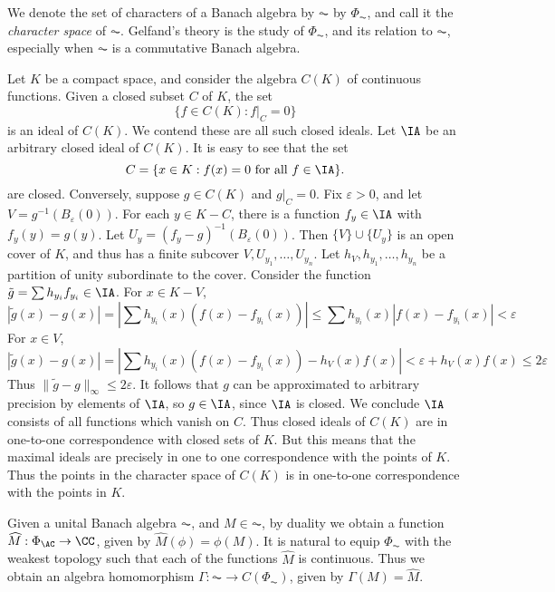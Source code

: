 We denote the set of characters of a Banach algebra by $\AC$ by $\Phi_{\AC}$, and call it the \emph{character space} of $\AC$. Gelfand's theory is the study of $\Phi_{\AC}$, and its relation to $\AC$, especially when $\AC$ is a commutative Banach algebra.

\begin{example}
    Let $K$ be a compact space, and consider the algebra $C(K)$ of continuous functions. Given a closed subset $C$ of $K$, the set
    \[ \{ f \in C(K) : f|_C = 0 \} \]
    is an ideal of $C(K)$. We contend these are all such closed ideals. Let $\IA$ be an arbitrary closed ideal of $C(K)$. It is easy to see that the set
    \[ C = \{ x \in K : f(x) = 0\ \text{for all $f \in \IA$} \}. \]
    are closed. Conversely, suppose $g \in C(K)$ and $g|_C = 0$. Fix $\varepsilon > 0$, and let $V = g^{-1}(B_\varepsilon(0))$. For each $y \in K - C$, there is a function $f_y \in \IA$ with $f_y(y) = g(y)$. Let $U_y = (f_y - g)^{-1}(B_\varepsilon(0))$. Then $\{ V \} \cup \{ U_y \}$ is an open cover of $K$, and thus has a finite subcover $V, U_{y_1}, \dots, U_{y_n}$. Let $h_V, h_{y_1}, \dots, h_{y_n}$ be a partition of unity subordinate to the cover. Consider the function $\tilde{g} = \sum h_{y_i} f_{y_i} \in \IA$. For $x \in K - V$,
    \[ |\tilde{g}(x) - g(x)| = | \sum h_{y_i}(x) (f(x) - f_{y_i}(x)) | \leq \sum h_{y_i}(x) |f(x) - f_{y_i}(x)| < \varepsilon \]
    For $x \in V$,
    \[ |\tilde{g}(x) - g(x)| = | \sum h_{y_i}(x) (f(x) - f_{y_i}(x)) - h_V(x) f(x) | < \varepsilon + h_V(x) f(x) \leq 2 \varepsilon \]
    Thus $\| \tilde{g} - g \|_\infty \leq 2 \varepsilon$. It follows that $g$ can be approximated to arbitrary precision by elements of $\IA$, so $g \in \IA$, since $\IA$ is closed. We conclude $\IA$ consists of all functions which vanish on $C$. Thus closed ideals of $C(K)$ are in one-to-one correspondence with closed sets of $K$. But this means that the maximal ideals are precisely in one to one correspondence with the points of $K$. Thus the points in the character space of $C(K)$ is in one-to-one correspondence with the points in $K$.
\end{example}

Given a unital Banach algebra $\AC$, and $M \in \AC$, by duality we obtain a function $\widehat{M}: \Phi_{\AC} \to \CC$, given by $\widehat{M}(\phi) = \phi(M)$. It is natural to equip $\Phi_{\AC}$ with the weakest topology such that each of the functions $\widehat{M}$ is continuous. Thus we obtain an algebra homomorphism $\Gamma: \AC \to C(\Phi_{\AC})$, given by $\Gamma(M) = \widehat{M}$.

